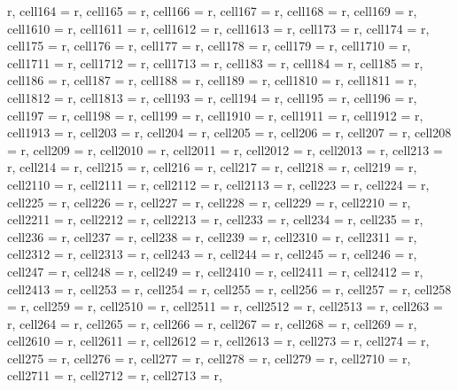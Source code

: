 \documentclass[journal]{IEEEtran}
\begin{document}
\begin{table}
\begin{adjustbox}{width=\textwidth}
\begin{tblr}
{{r},  cell{16}{4} = {r},  cell{16}{5} = {r},  cell{16}{6} = {r},  cell{16}{7} = {r},  cell{16}{8} = {r},  cell{16}{9} = {r},  cell{16}{10} = {r},  cell{16}{11} = {r},  cell{16}{12} = {r},  cell{16}{13} = {r},  cell{17}{3} = {r},  cell{17}{4} = {r},  cell{17}{5} = {r},  cell{17}{6} = {r},  cell{17}{7} = {r},  cell{17}{8} = {r},  cell{17}{9} = {r},  cell{17}{10} = {r},  cell{17}{11} = {r},  cell{17}{12} = {r},  cell{17}{13} = {r},  cell{18}{3} = {r},  cell{18}{4} = {r},  cell{18}{5} = {r},  cell{18}{6} = {r},  cell{18}{7} = {r},  cell{18}{8} = {r},  cell{18}{9} = {r},  cell{18}{10} = {r},  cell{18}{11} = {r},  cell{18}{12} = {r},  cell{18}{13} = {r},  cell{19}{3} = {r},  cell{19}{4} = {r},  cell{19}{5} = {r},  cell{19}{6} = {r},  cell{19}{7} = {r},  cell{19}{8} = {r},  cell{19}{9} = {r},  cell{19}{10} = {r},  cell{19}{11} = {r},  cell{19}{12} = {r},  cell{19}{13} = {r},  cell{20}{3} = {r},  cell{20}{4} = {r},  cell{20}{5} = {r},  cell{20}{6} = {r},  cell{20}{7} = {r},  cell{20}{8} = {r},  cell{20}{9} = {r},  cell{20}{10} = {r},  cell{20}{11} = {r},  cell{20}{12} = {r},  cell{20}{13} = {r},  cell{21}{3} = {r},  cell{21}{4} = {r},  cell{21}{5} = {r},  cell{21}{6} = {r},  cell{21}{7} = {r},  cell{21}{8} = {r},  cell{21}{9} = {r},  cell{21}{10} = {r},  cell{21}{11} = {r},  cell{21}{12} = {r},  cell{21}{13} = {r},  cell{22}{3} = {r},  cell{22}{4} = {r},  cell{22}{5} = {r},  cell{22}{6} = {r},  cell{22}{7} = {r},  cell{22}{8} = {r},  cell{22}{9} = {r},  cell{22}{10} = {r},  cell{22}{11} = {r},  cell{22}{12} = {r},  cell{22}{13} = {r},  cell{23}{3} = {r},  cell{23}{4} = {r},  cell{23}{5} = {r},  cell{23}{6} = {r},  cell{23}{7} = {r},  cell{23}{8} = {r},  cell{23}{9} = {r},  cell{23}{10} = {r},  cell{23}{11} = {r},  cell{23}{12} = {r},  cell{23}{13} = {r},  cell{24}{3} = {r},  cell{24}{4} = {r},  cell{24}{5} = {r},  cell{24}{6} = {r},  cell{24}{7} = {r},  cell{24}{8} = {r},  cell{24}{9} = {r},  cell{24}{10} = {r},  cell{24}{11} = {r},  cell{24}{12} = {r},  cell{24}{13} = {r},  cell{25}{3} = {r},  cell{25}{4} = {r},  cell{25}{5} = {r},  cell{25}{6} = {r},  cell{25}{7} = {r},  cell{25}{8} = {r},  cell{25}{9} = {r},  cell{25}{10} = {r},  cell{25}{11} = {r},  cell{25}{12} = {r},  cell{25}{13} = {r},  cell{26}{3} = {r},  cell{26}{4} = {r},  cell{26}{5} = {r},  cell{26}{6} = {r},  cell{26}{7} = {r},  cell{26}{8} = {r},  cell{26}{9} = {r},  cell{26}{10} = {r},  cell{26}{11} = {r},  cell{26}{12} = {r},  cell{26}{13} = {r},  cell{27}{3} = {r},  cell{27}{4} = {r},  cell{27}{5} = {r},  cell{27}{6} = {r},  cell{27}{7} = {r},  cell{27}{8} = {r},  cell{27}{9} = {r},  cell{27}{10} = {r},  cell{27}{11} = {r},  cell{27}{12} = {r},  cell{27}{13} = {r},
}
\end{tblr}
\end{adjustbox}
\end{table}
\end{document}

